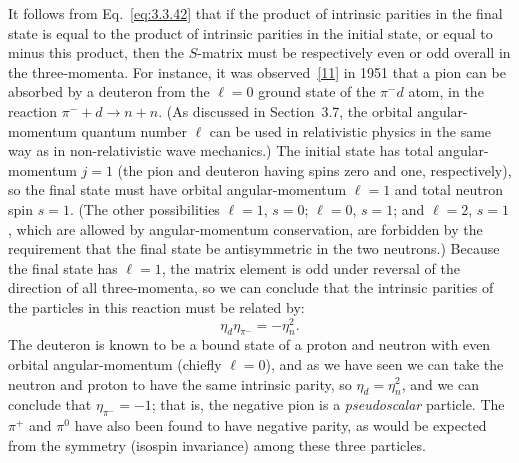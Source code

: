 It follows from Eq.~\eqref{eq:3.3.42} that if the product of intrinsic parities in the final
state is equal to the product of intrinsic parities in the initial state, or equal
to minus this product, then the $S$-matrix must be respectively even or odd overall
in the three-momenta. For instance, it was observed~\hyperref[ref:3.11]{[11]} in 1951 that a pion can be
absorbed by a deuteron from the $\ell=0$ ground state of the $\pi^-d$ atom, in the
reaction $\pi^-+d\to n+n$. (As discussed in Section~3.7, the orbital
angular-momentum quantum number $\ell$ can be used in relativistic physics in the
same way as in non-relativistic wave mechanics.) The initial state has total
angular-momentum $j=1$ (the pion and deuteron having spins zero and one,
respectively), so the final state must have orbital angular-momentum $\ell=1$ and
total neutron spin $s=1$. (The other possibilities $\ell=1$, $s=0$;
$\ell=0$, $s=1$; and $\ell=2$, $s=1$, which are allowed by angular-momentum
conservation, are forbidden by the requirement that the final state be
antisymmetric in the two neutrons.) Because the final state has $\ell=1$, the
matrix element is odd under reversal of the direction of all three-momenta, so we
can conclude that the intrinsic parities of the particles in this reaction must be
related by:
\[
\eta_d\eta_{\pi^-}=-\eta_n^2.
\]
The deuteron is known to be a bound state of a proton and neutron with even orbital
angular-momentum (chiefly $\ell=0$), and as we have seen we can take the neutron and
proton to have the same intrinsic parity, so $\eta_d=\eta_n^2$, and we can conclude
that $\eta_{\pi^-}=-1$; that is, the negative pion is a \textit{pseudoscalar}
particle. The $\pi^+$ and $\pi^0$ have also been found to have negative parity, as
would be expected from the symmetry (isospin invariance) among these three particles.

